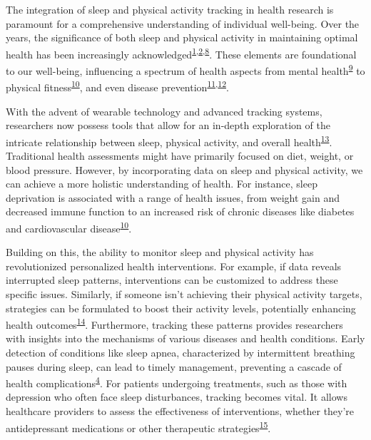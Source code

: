 \documentclass[
  9pt,
]{article}
\begin{document}
The integration of sleep and physical activity tracking in health
research is paramount for a comprehensive understanding of individual
well-being. Over the years, the significance of both sleep and physical
activity in maintaining optimal health has been increasingly
acknowledged\textsuperscript{\protect\hyperlink{ref-kraus_physical_2019}{1},\protect\hyperlink{ref-lee_effect_2012}{2},\protect\hyperlink{ref-liguori_evolving_2023}{8}}.
These elements are foundational to our well-being, influencing a
spectrum of health aspects from mental
health\textsuperscript{\protect\hyperlink{ref-biddle_physical_2011}{9}}
to physical
fitness\textsuperscript{\protect\hyperlink{ref-warburton_health_2017}{10}},
and even disease
prevention\textsuperscript{\protect\hyperlink{ref-strath_guide_2013}{11},\protect\hyperlink{ref-arem_leisure_2015}{12}}.

With the advent of wearable technology and advanced tracking systems,
researchers now possess tools that allow for an in-depth exploration of
the intricate relationship between sleep, physical activity, and overall
health\textsuperscript{\protect\hyperlink{ref-rollo_whole_2020}{13}}.
Traditional health assessments might have primarily focused on diet,
weight, or blood pressure. However, by incorporating data on sleep and
physical activity, we can achieve a more holistic understanding of
health. For instance, sleep deprivation is associated with a range of
health issues, from weight gain and decreased immune function to an
increased risk of chronic diseases like diabetes and cardiovascular
disease\textsuperscript{\protect\hyperlink{ref-warburton_health_2017}{10}}.

Building on this, the ability to monitor sleep and physical activity has
revolutionized personalized health interventions. For example, if data
reveals interrupted sleep patterns, interventions can be customized to
address these specific issues. Similarly, if someone isn't achieving
their physical activity targets, strategies can be formulated to boost
their activity levels, potentially enhancing health
outcomes\textsuperscript{\protect\hyperlink{ref-rosenberger_24-hour_2019}{14}}.
Furthermore, tracking these patterns provides researchers with insights
into the mechanisms of various diseases and health conditions. Early
detection of conditions like sleep apnea, characterized by intermittent
breathing pauses during sleep, can lead to timely management, preventing
a cascade of health
complications\textsuperscript{\protect\hyperlink{ref-cappuccio_sleep_2010}{4}}.
For patients undergoing treatments, such as those with depression who
often face sleep disturbances, tracking becomes vital. It allows
healthcare providers to assess the effectiveness of interventions,
whether they're antidepressant medications or other therapeutic
strategies\textsuperscript{\protect\hyperlink{ref-paruthi_consensus_2016}{15}}.
\end{document}
